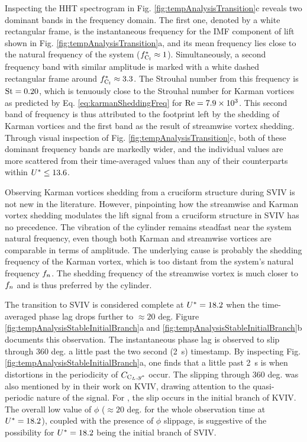 \documentclass[oneside]{utmthesis}
\begin{document}
Inspecting the HHT spectrogram in Fig. \ref{fig:tempAnalysisTransition}c reveals two dominant bands in the frequency domain. The first one, denoted by a white rectangular frame, is the instantaneous frequency for the IMF component of lift shown in Fig. \ref{fig:tempAnalysisTransition}a, and its mean frequency lies close to the natural frequency of the system ($f_{\text{C}_{l}}^{*} \approx 1$). Simultaneously, a second frequency band with similar amplitude is marked with a white dashed rectangular frame around $f_{\text{C}_{l}}^{*} \approx 3.3$. The Strouhal number from this frequency is $\text{St} = 0.20$, which is tenuously close to the Strouhal number for Karman vortices as predicted by Eq. \ref{eq:karmanSheddingFreq} for $\text{Re} = 7.9 \times 10^{3}$. This second band of frequency is thus attributed to the footprint left by the shedding of Karman vortices and the first band as the result of streamwise vortex shedding. Through visual inspection of Fig. \ref{fig:tempAnalysisTransition}c, both of these dominant frequency bands are markedly wider, and the individual values are more scattered from their time-averaged values than any of their counterparts within $U^{*} \leq 13.6$.

Observing Karman vortices shedding from a cruciform structure during SVIV is not new in the literature. However, pinpointing how the streamwise and Karman vortex shedding modulates the lift signal from a cruciform structure in SVIV has no precedence. The vibration of the cylinder remains steadfast near the system natural frequency, even though both Karman and streamwise vortices are comparable in terms of amplitude. The underlying cause is probably the shedding frequency of the Karman vortex, which is too distant from the system's natural frequency $f_{n}$. The shedding frequency of the streamwise vortex is much closer to $f_{n}$ and is thus preferred by the cylinder.

The transition to SVIV is considered complete at $U^{*} = 18.2$ when the time-averaged phase lag drops further to $\approx 20$ deg. Figure \ref{fig:tempAnalysisStableInitialBranch}a and \ref{fig:tempAnalysisStableInitialBranch}b documents this observation. The instantaneous phase lag is observed to slip through 360 deg. a little past the two second (\SI{2}{\second}) timestamp. By inspecting Fig. \ref{fig:tempAnalysisStableInitialBranch}a, one finds that a little past \SI{2}{\second} is when distortions in the periodicity of $C_{\text{C}_{L},y^{*}}$ occur. The slipping through 360 deg. was also mentioned by \citet{Khalak1999} in their work on KVIV, drawing attention to the quasi-periodic nature of the signal. For \citet{Khalak1999}, the slip occurs in the initial branch of KVIV. The overall low value of $\phi$ ($\approx 20$ deg. for the whole observation time at $U^{*} = 18.2$), coupled with the presence of $\phi$ slippage, is suggestive of the possibility for $U^{*} = 18.2$ being the initial branch of SVIV.
\end{document}
